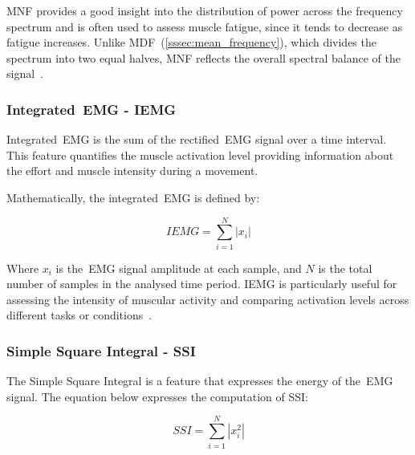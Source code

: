 MNF provides a good insight into the distribution of power across the frequency spectrum and is often used to assess muscle fatigue, since it tends to decrease as fatigue increases. 
Unlike MDF~(\autoref{sssec:mean_frequency}), which divides the spectrum into two equal halves, MNF reflects the overall spectral balance of the signal~\cite{HandGestureRecognition, 
ComprehensiveStudyOnEMG, Review_IRBM_EMG, ReviewOfEMGSignalClassification, Hybrid, EvaluationOfFeatureExtractionAndRecognition}.



\subsubsection{Integrated~\gls{EMG} - IEMG}
\label{sssec:integrated_emg}

Integrated~\gls{EMG} is the sum of the rectified~\gls{EMG} signal over a time interval. This feature quantifies the muscle activation level providing information about the effort 
and muscle intensity during a movement.

Mathematically, the integrated~\gls{EMG} is defined by:

\begin{equation}
  IEMG = \sum_{i = 1}^{N} \left\lvert x_i \right\rvert 
  \label{eq:iemgEQ}
\end{equation}

Where $x_i$ is the~\gls{EMG} signal amplitude at each sample, and $N$ is the total number of samples in the analysed time period.
IEMG is particularly useful for assessing the intensity of muscular activity and comparing activation levels across different tasks or conditions~\cite{ComprehensiveStudyOnEMG, 
BiomedicalSignalProcessingAndControl, Review_IRBM_EMG}.

\subsubsection{Simple Square Integral - SSI} 
\label{sssec:simple_square_integral}

The Simple Square Integral is a feature that expresses the energy of the~\gls{EMG} signal. 
The equation below expresses the computation of SSI:

\begin{equation}
  SSI = \sum_{i = 1}^{N} \left\lvert x_i^2 \right\rvert 
  \label{eq:ssiEQ}
\end{equation}

